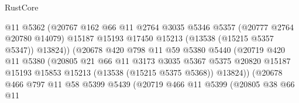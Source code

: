 \begin{lexlean}{RustCore}
\begin{coremodule}
                                    @11
                                    @5362
                                    (@20767
                                      @162
                                      @66
                                      @11
                                      @2764
                                      @3035
                                      @5346
                                      @5357
                                      (@20777 @2764 @20780 @14079)
                                      @15187
                                      @15193
                                      @17450
                                      @15213
                                      (@13538 (@15215 @5357 @5347))
                                      @13824))
                                  (@20678
                                    @420
                                    @798
                                    @11
                                    @59
                                    @5380
                                    @5440
                                    (@20719
                                      @420
                                      @11
                                      @5380
                                      (@20805
                                        @21
                                        @66
                                        @11
                                        @3173
                                        @3035
                                        @5367
                                        @5375
                                        @20820
                                        @15187
                                        @15193
                                        @15853
                                        @15213
                                        (@13538 (@15215 @5375 @5368))
                                        @13824))
                                    (@20678
                                      @466
                                      @797
                                      @11
                                      @58
                                      @5399
                                      @5439
                                      (@20719
                                        @466
                                        @11
                                        @5399
                                        (@20805
                                          @38
                                          @66
                                          @11

\end{coremodule}
\end{lexlean}
